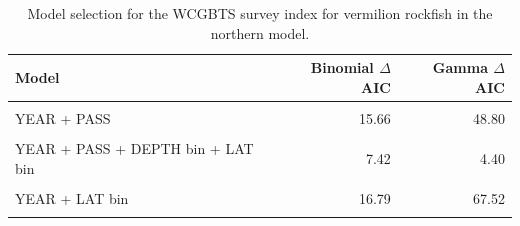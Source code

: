 \documentclass[11pt,
  english,
]{article}
\begin{document}
\FloatBarrier

\begin{table}

\caption{\label{tab:tab-model-select-wcgbts}Model selection for the WCGBTS survey index for vermilion rockfish in the northern model.}
\centering
\begin{tabular}[t]{lrr}
\toprule
Model & Binomial $\Delta$AIC & Gamma $\Delta$AIC\\
\midrule
\cellcolor{gray!6}{1} & \cellcolor{gray!6}{0.00} & \cellcolor{gray!6}{67.52}\\
YEAR + PASS & 15.66 & 48.80\\
\cellcolor{gray!6}{YEAR + PASS + DEPTH bin} & \cellcolor{gray!6}{15.59} & \cellcolor{gray!6}{0.00}\\
YEAR + PASS + DEPTH bin + LAT bin & 7.42 & 4.40\\
\cellcolor{gray!6}{YEAR + DEPTH bin + LAT bin} & \cellcolor{gray!6}{12.04} & \cellcolor{gray!6}{10.96}\\
\addlinespace
YEAR + LAT bin & 16.79 & 67.52\\
\cellcolor{gray!6}{YEAR + PASS + LAT bin} & \cellcolor{gray!6}{12.89} & \cellcolor{gray!6}{53.13}\\
\bottomrule
\end{tabular}
\end{table}

\FloatBarrier
\end{document}
